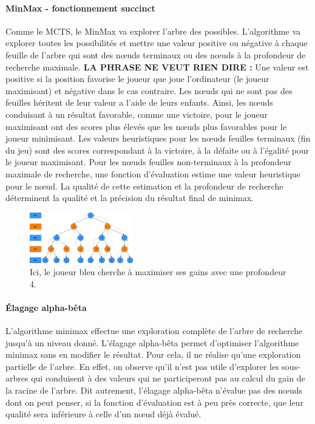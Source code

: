 \paragraph{MinMax - fonctionnement succinct}
Comme le MCTS, le MinMax va explorer l'arbre des possibles. L'algorithme va explorer toutes les possibilités et mettre une valeur positive ou négative
à chaque feuille de l'arbre qui sont des nœuds terminaux ou des nœuds à la profondeur de recherche maximale.
\textbf{LA PHRASE NE VEUT RIEN DIRE :} Une valeur est positive si la position favorise le joueur que joue l'ordinateur (le joueur maximisant) et négative dans le cas contraire.
Les nœuds qui ne sont pas des feuilles héritent de leur valeur a l'aide de leurs enfants.
Ainsi, les nœuds conduisant à un résultat favorable, comme une victoire, pour le joueur maximisant ont des scores plus élevés que les nœuds 
plus favorables pour le joueur minimisant. Les valeurs heuristiques pour les nœuds feuilles terminaux (fin du jeu) sont des scores correspondant 
à la victoire, à la défaite ou à l'égalité pour le joueur maximisant. Pour les nœuds feuilles non-terminaux à la profondeur maximale de recherche, 
une fonction d'évaluation estime une valeur heuristique pour le nœud. La qualité de cette estimation et la profondeur de recherche déterminent la 
qualité et la précision du résultat final de minimax.


\begin{figure}[h]
    \begin{center}
        \includegraphics[width=0.4\textwidth]{root/MinMax.jpeg}
    \end{center}
    \caption{Ici, le joueur bleu cherche à maximiser ses gains avec une profondeur 4.}\label{fig:min_max}
\end{figure}


\paragraph{Élagage alpha-bêta}
L'algorithme minimax effectue une exploration complète de l'arbre de recherche jusqu'à un niveau donné. L'élagage alpha-bêta permet d'optimiser 
l'algorithme minimax sans en modifier le résultat. Pour cela, il ne réalise qu'une exploration
partielle de l'arbre. En effet, on observe qu'il n'est pas utile d'explorer les sous-arbres qui conduisent à des valeurs
qui ne participeront pas au calcul du gain de la racine de l'arbre. Dit autrement, l'élagage alpha-bêta n'évalue pas des nœuds dont on peut penser, 
si la fonction d'évaluation est à peu près correcte, que leur qualité sera inférieure à celle d'un nœud déjà évalué.

